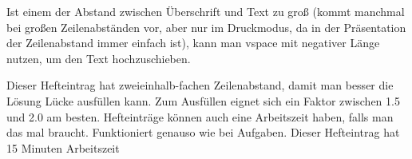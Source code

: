 {
    \ifbeamer\else\vspace{-0.6cm}\fi
    
    Ist einem der Abstand zwischen Überschrift und Text zu groß (kommt manchmal bei großen Zeilenabständen vor, aber nur im Druckmodus, da in der Präsentation der Zeilenabstand immer einfach ist), kann man vspace mit negativer Länge nutzen, um den Text hochzuschieben.

    Dieser Hefteintrag hat zweieinhalb-fachen Zeilenabstand, damit man besser die Lösung Lücke ausfüllen kann. Zum Ausfüllen eignet sich ein Faktor zwischen 1.5 und 2.0 am besten. Hefteinträge können auch eine Arbeitszeit haben, falls man das mal braucht. Funktioniert genauso wie bei Aufgaben. Dieser Hefteintrag hat 15 Minuten Arbeitszeit
}